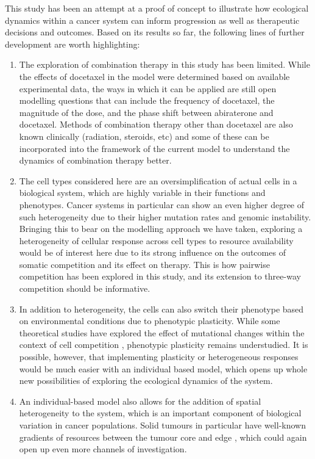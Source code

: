 This study has been an attempt at a proof of concept to illustrate how ecological dynamics within a cancer system can inform progression as well as therapeutic decisions and outcomes. Based on its results so far, the following lines of further development are worth highlighting:
\begin{enumerate}
  \item The exploration of combination therapy in this study has been limited. While the effects of docetaxel in the model were determined based on available experimental data, the ways in which it can be applied are still open modelling questions that can include the frequency of docetaxel, the magnitude of the dose, and the phase shift between abiraterone and docetaxel. Methods of combination therapy other than docetaxel are also known clinically (radiation, steroids, etc) and some of these can be incorporated into the framework of the current model to understand the dynamics of combination therapy better.
  \item The cell types considered here are an oversimplification of actual cells in a biological system, which are highly variable in their functions and phenotypes. Cancer systems in particular can show an even higher degree of such heterogeneity due to their higher mutation rates and genomic instability. Bringing this to bear on the modelling approach we have taken, exploring a heterogeneity of cellular response across cell types to resource availability would be of interest here due to its strong influence on the outcomes of somatic competition and its effect on therapy. This is how pairwise competition has been explored in this study, and its extension to three-way competition should be informative.
  \item In addition to heterogeneity, the cells can also switch their phenotype based on environmental conditions due to phenotypic plasticity. While some theoretical studies have explored the effect of mutational changes within the context of cell competition \cite{Snippert}, phenotypic plasticity remains understudied. It is possible, however, that implementing plasticity or heterogeneous responses would be much easier with an individual based model, which opens up whole new possibilities of exploring the ecological dynamics of the system.
  \item An individual-based model also allows for the addition of spatial heterogeneity to the system, which is an important component of biological variation in cancer populations. Solid tumours in particular have well-known gradients of resources between the tumour core and edge \cite{Fontaine}, which could again open up even more channels of investigation.
\end{enumerate}


